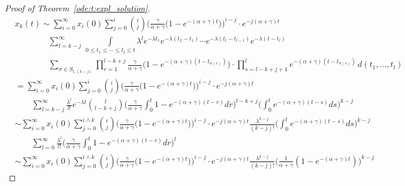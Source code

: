 \begin{proof}[Proof of Theorem~\ref{ode:t:expl_solution}]
{\small
\begin{align*} 
&x_k(t) \sim \sum_{i=0}^\infty x_i(0) \sum_{j=0}^i \binom{i}{j}
  \Big(\frac{\gamma}{\alpha+\gamma}\big( 1-e^{-(\alpha+\gamma)t}\big)\Big)^{i-j} \cdot
  e^{-j(\alpha+\gamma)t} \\ 
& \qquad \qquad \sum_{l=k-j}^\infty \, \int\limits_{{0\leq t_1\leq\cdots \leq t_l} \leq t}
   \lambda^{l} e^{-\lambda t_1}e^{-\lambda(t_2-t_1)}
  \cdots e^{-\lambda(t_{l}-t_{l-1})} e^{-\lambda(t-t_{l})} \\
& \qquad \qquad \sum_{\sigma \in S_{l,(k-j)}}
  \prod_{r = 1}^{l-k+j} \frac{\gamma}{\alpha+\gamma}\big(
  1-e^{-(\alpha+\gamma)(t-t_{\sigma(r)})}\big) \cdot \prod_{s = l-k+j+1}^l
  e^{-(\alpha+\gamma)(t-t_{\sigma(s)})} \, d(t_1,...,t_{l})
  \\
& = \sum_{i=0}^\infty x_i(0) \sum_{j=0}^i \binom{i}{j}
  \Big(\frac{\gamma}{\alpha+\gamma}\big(
  1-e^{-(\alpha+\gamma)t}\big)\Big)^{i-j} \cdot e^{-j(\alpha+\gamma)t} \\ 
& \qquad \sum_{l=k-j}^\infty \frac{\lambda^l}{l!} e^{-\lambda t}
  \binom{l}{l-k+j}\Big( \frac{\gamma}{\alpha+\gamma}\int_0^t
  1-e^{-(\alpha+\gamma)(t-r)}dr\Big)^{l-k+j} 
  \Big(\int_0^te^{-(\alpha+\gamma)(t-s)}ds \Big)^{k-j} \\ 
& \sim \sum_{i=0}^\infty x_i(0) \sum_{j=0}^{i\wedge k} \binom{i}{j}
  \Big(\frac{\gamma}{\alpha+\gamma}\big(
  1-e^{-(\alpha+\gamma)t}\big)\Big)^{i-j} \cdot e^{-j(\alpha+\gamma)t}
  \frac{\lambda^{k-j}}{(k-j)!}
  \Big(\int_0^te^{-(\alpha+\gamma)(t-s)}ds \Big)^{k-j} \\ 
& \qquad \sum_{l=0}^\infty \frac{\lambda^l}{l!} \Big(
  \frac{\gamma}{\alpha+\gamma}\int_0^t
  1-e^{-(\alpha+\gamma)(t-r)}dr\Big)^{l} \\ 
& \sim \sum_{i=0}^\infty
  x_i(0) \sum_{j=0}^{i\wedge k} \binom{i}{j}
  \Big(\frac{\gamma}{\alpha+\gamma}\big(
  1-e^{-(\alpha+\gamma)t}\big)\Big)^{i-j} \cdot e^{-j(\alpha+\gamma)t}
  \frac{\lambda^{k-j}}{(k-j)!}  \Big(\frac{1}{\alpha+\gamma}
  (1-e^{-(\alpha+\gamma)t}) \Big)^{k-j}
\end{align*}}


\end{proof}
